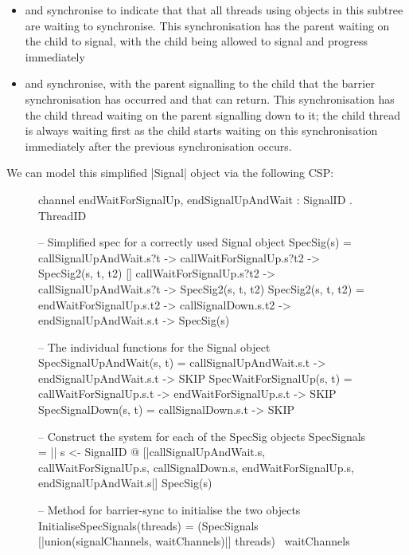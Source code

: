 \begin{itemize}
  \item {} and  synchronise to indicate that that all threads using objects in this subtree are waiting to synchronise. This synchronisation has the parent waiting on the child to signal, with the child being allowed to signal and progress immediately
  \item {} and  synchronise, with the parent signalling to the child that the barrier synchronisation has occurred and that  can return. This synchronisation has the child thread waiting on the parent signalling down to it; the child thread is always waiting first as the child starts waiting on this synchronisation immediately after the previous synchronisation occurs.
\end{itemize}

We can model this simplified |Signal| object via the following CSP:

\begin{figure}[H]
  \begin{cspm}
  channel endWaitForSignalUp, endSignalUpAndWait : SignalID . ThreadID

  -- Simplified spec for a correctly used Signal object
  SpecSig(s) = 
      callSignalUpAndWait.s?t -> callWaitForSignalUp.s?t2 -> SpecSig2(s, t, t2)
    [] callWaitForSignalUp.s?t2 -> callSignalUpAndWait.s?t -> SpecSig2(s, t, t2)
  SpecSig2(s, t, t2) = 
    endWaitForSignalUp.s.t2 -> callSignalDown.s.t2 -> endSignalUpAndWait.s.t -> SpecSig(s)

  -- The individual functions for the Signal object
  SpecSignalUpAndWait(s, t) = callSignalUpAndWait.s.t -> endSignalUpAndWait.s.t -> SKIP
  SpecWaitForSignalUp(s, t) = callWaitForSignalUp.s.t -> endWaitForSignalUp.s.t -> SKIP
  SpecSignalDown(s, t) = callSignalDown.s.t -> SKIP

  -- Construct the system for each of the SpecSig objects
  SpecSignals = 
    || s <- SignalID @ [{|callSignalUpAndWait.s, callWaitForSignalUp.s, 
                          callSignalDown.s, endWaitForSignalUp.s, endSignalUpAndWait.s|}] 
                       SpecSig(s)

  -- Method for barrier-sync to initialise the two objects
  InitialiseSpecSignals(threads) = 
    (SpecSignals [|union(signalChannels, waitChannels)|] threads) \ waitChannels                     
  \end{cspm}  
\end{figure}

